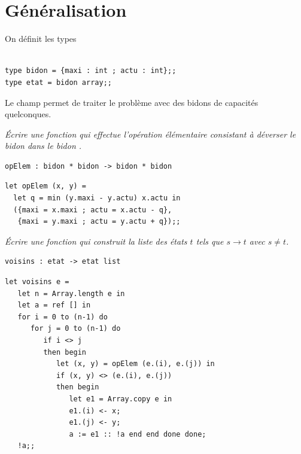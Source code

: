 \section{Généralisation}

On définit les types 
\begin{lstlisting}

type bidon = {maxi : int ; actu : int};;
type etat = bidon array;;
\end{lstlisting}

Le champ  permet de traiter le problème avec des bidons de capacités quelconques.
\begin{Exercise}
{\it Écrire une fonction  qui effectue  l'opération élémentaire consistant à déverser le bidon  dans le bidon . }
\begin{lstlisting}
opElem : bidon * bidon -> bidon * bidon
\end{lstlisting}
\end{Exercise}
\begin{Answer}
\begin{lstlisting}
let opElem (x, y) = 
  let q = min (y.maxi - y.actu) x.actu in 
  ({maxi = x.maxi ; actu = x.actu - q}, 
   {maxi = y.maxi ; actu = y.actu + q});;
\end{lstlisting}
\end{Answer}
\begin{Exercise}
{\it Écrire  une fonction  qui construit la liste des états $t$ tels que $s \rightarrow t$ avec $s\ne t$.}
\begin{lstlisting}
voisins : etat -> etat list
\end{lstlisting}
\end{Exercise}
\begin{Answer}
\begin{lstlisting}
let voisins e = 
   let n = Array.length e in
   let a = ref [] in
   for i = 0 to (n-1) do
      for j = 0 to (n-1) do
         if i <> j
         then begin
            let (x, y) = opElem (e.(i), e.(j)) in
            if (x, y) <> (e.(i), e.(j))
            then begin
               let e1 = Array.copy e in
               e1.(i) <- x;
               e1.(j) <- y;
               a := e1 :: !a end end done done;
   !a;;
\end{lstlisting}
\end{Answer}
